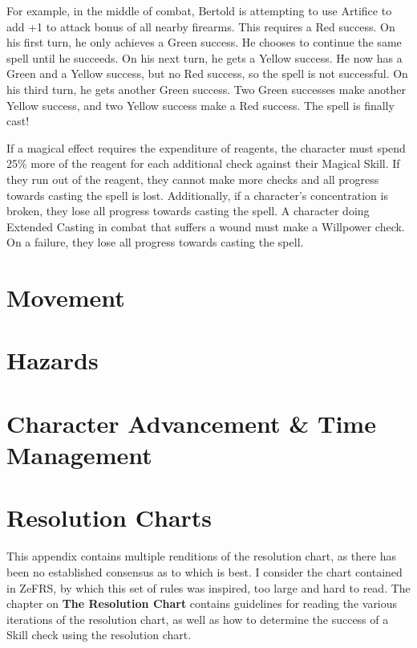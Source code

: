 \documentclass[oneside]{book}
\begin{document}
\begin{multicols}{2}
For example, in the middle of combat, Bertold is attempting to use Artifice to add +1 to attack bonus of all nearby firearms. This requires a Red success. On his first turn, he only achieves a Green success. He chooses to continue the same spell until he succeeds. On his next turn, he gets a Yellow success. He now has a Green and a Yellow success, but no Red success, so the spell is not successful. On his third turn, he gets another Green success. Two Green successes make another Yellow success, and two Yellow success make a Red success. The spell is finally cast!

If a magical effect requires the expenditure of reagents, the character must spend 25\% more of the reagent for each additional check against their Magical Skill. If they run out of the reagent, they cannot make more checks and all progress towards casting the spell is lost. Additionally, if a character's concentration is broken, they lose all progress towards casting the spell. A character doing Extended Casting in combat that suffers a wound must make a Willpower check. On a failure, they lose all progress towards casting the spell. 

\end{multicols}

\chapter{Movement}

\chapter{Hazards}

\chapter{Character Advancement \& Time Management}

\appendix
\chapter{Resolution Charts}
This appendix contains multiple renditions of the resolution chart, as there has been no established consensus as to which is best. I consider the chart contained in ZeFRS, by which this set of rules was inspired, too large and hard to read. The chapter on \textbf{The Resolution Chart} contains guidelines for reading the various iterations of the resolution chart, as well as how to determine the success of a Skill check using the resolution chart. 
\end{document}
